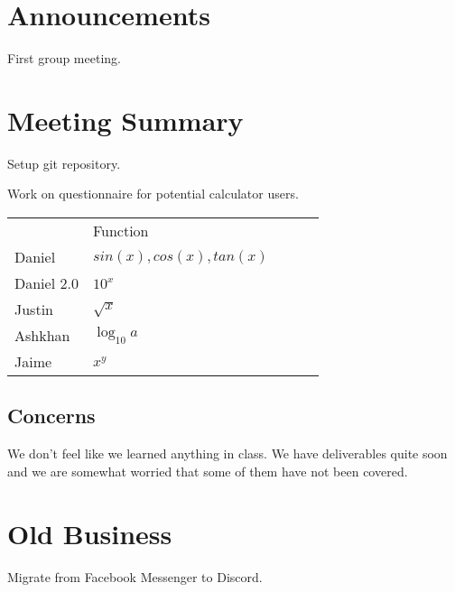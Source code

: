 \documentclass[11pt]{meetingmins}
\begin{document}
\maketitle

\section{Announcements}
\begin{hiddenitems}
\item
First group meeting.

\end{hiddenitems}

\section{Meeting Summary}
\begin{items}

\item
Setup git repository.

\item
Work on questionnaire for potential calculator users.

\end{items}

\begin{table}
\centering
\begin{tabular}{|l|l|lll} 
\cline{2-2}
\multicolumn{1}{l|}{} & Function    &  &  &   \\ 
\cline{1-2}
Daniel                & $sin(x), cos(x), tan(x)$ &  &  &   \\ 
\cline{1-2}
Daniel 2.0            & $10^x$       &  &  &   \\ 
\cline{1-2}
Justin                & $\sqrt{x}$     &  &  &   \\ 
\cline{1-2}
Ashkhan               & $\log_{10} a$    &  &  &   \\ 
\cline{1-2}
Jaime                 & $x^y$        &  &  &   \\
\cline{1-2}
\end{tabular}
\end{table}


\subsection{Concerns}
We don't feel like we learned anything in class. We have deliverables quite soon and we are somewhat worried that some of them have not been covered.

\section{Old Business}
\begin{items}

\item
Migrate from Facebook Messenger to Discord.

\end{items}
\end{document}
